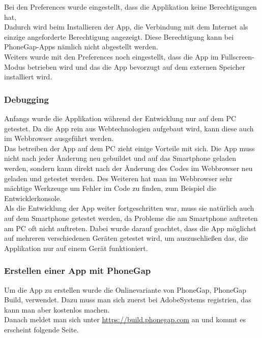 Bei den Preferences wurde eingestellt, dass die Applikation keine Berechtigungen hat,\\



Dadurch wird beim Installieren der App, die Verbindung mit dem Internet als einzige angeforderte Berechtigung angezeigt. Diese Berechtigung kann bei PhoneGap-Apps nämlich nicht abgestellt werden.\\

Weiters wurde mit den Preferences noch eingestellt, dass die App im Fullscreen-Modus betrieben wird und das die App bevorzugt auf dem externen Speicher installiert wird.\\

\subsubsection{Debugging}
Anfangs wurde die Applikation während der Entwicklung nur auf dem PC getestet. Da die App rein aus Webtechnologien aufgebaut wird, kann diese auch im Webbrowser ausgeführt werden.\\
Das betreiben der App auf dem PC zieht einige Vorteile mit sich. Die App muss nicht nach jeder Änderung neu gebuildet und auf das Smartphone geladen werden, sondern kann direkt nach der Änderung des Codes im Webbrowser neu geladen und getestet werden. Des Weiteren hat man im Webbrowser sehr mächtige Werkzeuge um Fehler im Code zu finden, zum Beispiel die Entwicklerkonsole.\\
Als die Entwicklung der App weiter fortgeschritten war, muss sie natürlich auch auf dem Smartphone getestet werden, da Probleme die am Smartphone auftreten am PC oft nicht auftreten. Dabei wurde darauf geachtet, dass die App möglichst auf mehreren verschiedenen Geräten getestet wird, um auszuschließen das, die Applikation nur auf einem Gerät funktioniert.\\
\subsubsection{Erstellen einer App mit PhoneGap}
Um die App zu erstellen wurde die Onlinevariante von PhoneGap, PhoneGap Build, verwendet. Dazu muss man sich zuerst bei AdobeSystems registrien, das kann man aber kostenlos machen.\\
Danach meldet man sich unter \href{https://build.phonegap.com}{https://build.phonegap.com} an und kommt es erscheint folgende Seite.\\


